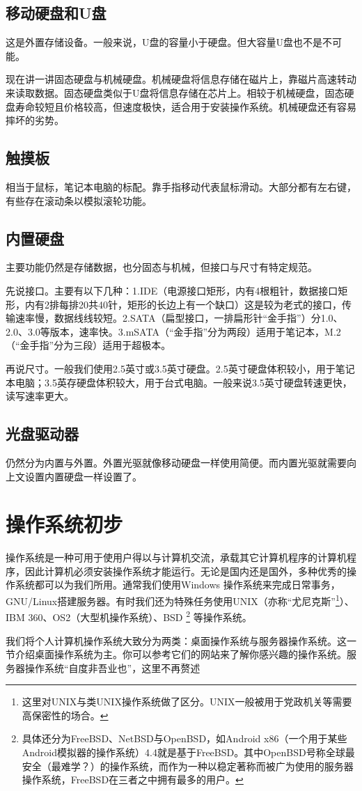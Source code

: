 \subsection{移动硬盘和U盘}
这是外置存储设备。一般来说，U盘的容量小于硬盘。但大容量U盘也不是不可能。\par
现在讲一讲固态硬盘与机械硬盘。机械硬盘将信息存储在磁片上，靠磁片高速转动来读取数据。固态硬盘类似于U盘将信息存储在芯片上。相较于机械硬盘，固态硬盘寿命较短且价格较高，但速度极快，适合用于安装操作系统。机械硬盘还有容易摔坏的劣势。
\subsection{触摸板}
相当于鼠标，笔记本电脑的标配。靠手指移动代表鼠标滑动。大部分都有左右键，有些存在滚动条以模拟滚轮功能。
\subsection{内置硬盘}
主要功能仍然是存储数据，也分固态与机械，但接口与尺寸有特定规范。\par
先说接口。主要有以下几种：1.IDE（电源接口矩形，内有4根粗针，数据接口矩形，内有2排每排20共40针，矩形的长边上有一个缺口）这是较为老式的接口，传输速率慢，数据线线较短。2.SATA（扁型接口，一排扁形针“金手指”）分1.0、2.0、3.0等版本，速率快。3.mSATA（“金手指”分为两段）适用于笔记本，M.2（“金手指”分为三段）适用于超极本。\par
再说尺寸。一般我们使用2.5英寸或3.5英寸硬盘。2.5英寸硬盘体积较小，用于笔记本电脑；3.5英存硬盘体积较大，用于台式电脑。一般来说3.5英寸硬盘转速更快，读写速率更大。
\subsection{光盘驱动器}
仍然分为内置与外置。外置光驱就像移动硬盘一样使用简便。而内置光驱就需要向上文设置内置硬盘一样设置了。
\section{操作系统初步}
操作系统是一种可用于使用户得以与计算机交流，承载其它计算机程序的计算机程序，因此计算机必须安装操作系统才能运行。无论是国内还是国外，多种优秀的操作系统都可以为我们所用。通常我们使用Windows 操作系统来完成日常事务，GNU/Linux搭建服务器。有时我们还为特殊任务使用UNIX（亦称“尤尼克斯”\footnote{这里对UNIX与类UNIX操作系统做了区分。UNIX一般被用于党政机关等需要高保密性的场合。}）、IBM 360、OS2（大型机操作系统）、BSD \footnote{具体还分为FreeBSD、NetBSD与OpenBSD，如Android x86（一个用于某些Android模拟器的操作系统）4.4就是基于FreeBSD。其中OpenBSD号称全球最安全（最难学？）的操作系统，而作为一种以稳定著称而被广为使用的服务器操作系统，FreeBSD在三者之中拥有最多的用户。} 等操作系统。\par
我们将个人计算机操作系统大致分为两类：桌面操作系统与服务器操作系统。这一节介绍桌面操作系统为主。你可以参考它们的网站来了解你感兴趣的操作系统。服务器操作系统“自度非吾业也”，这里不再赘述
